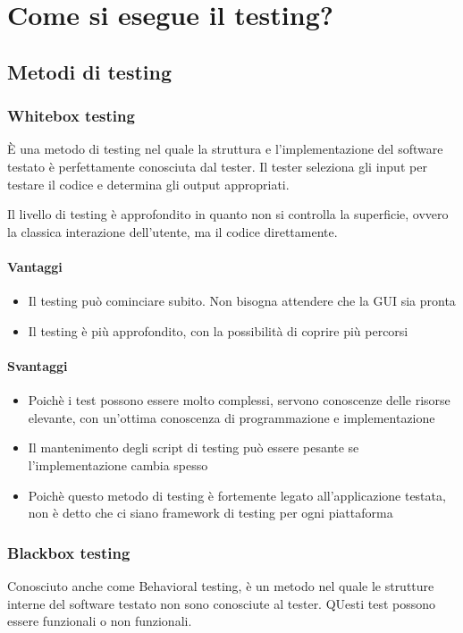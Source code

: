 \documentclass[11pt,a4paper]{book}
\begin{document}
\chapter{Come si esegue il testing?}
\section{Metodi di testing}
\subsection{Whitebox testing}\label{par: whitebox}
È una metodo di testing nel quale la struttura e l'implementazione del software testato è perfettamente conosciuta dal tester. Il tester seleziona gli input per testare il codice e determina gli output appropriati.

Il livello di testing è approfondito in quanto non si controlla la superficie, ovvero la classica interazione dell'utente, ma il codice direttamente.

\subsubsection{Vantaggi}
\begin{itemize}
	\item Il testing può cominciare subito. Non bisogna attendere che la GUI sia pronta
	\item Il testing è più approfondito, con la possibilità di coprire più percorsi
\end{itemize}

\subsubsection{Svantaggi}
\begin{itemize}
	\item Poichè i test possono essere molto complessi, servono conoscenze delle risorse elevante, con un'ottima conoscenza di programmazione e implementazione
	\item Il mantenimento degli script di testing può essere pesante se l'implementazione cambia spesso
	\item Poichè questo metodo di testing è fortemente legato all'applicazione testata, non è detto che ci siano framework di testing per ogni piattaforma
\end{itemize}

\subsection{Blackbox testing}\label{par: blackbox}
Conosciuto anche come Behavioral testing, è un metodo nel quale le strutture interne del software testato non sono conosciute al tester. QUesti test possono essere funzionali o non funzionali.
\end{document}

